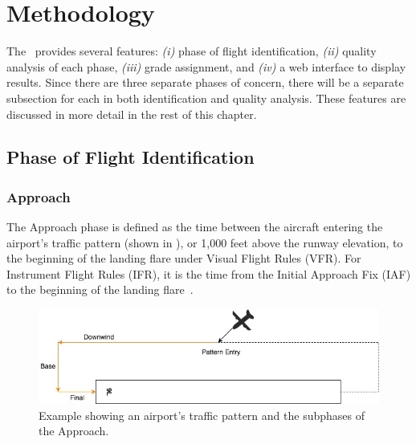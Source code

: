 \chapter{Methodology} \label{ch:methodology}

	The \toolname\ provides several features: \textit{(i)} phase of flight identification, \textit{(ii)} quality analysis of each phase, \textit{(iii)} grade assignment, and \textit{(iv)} a web interface to display results.  Since there are three separate phases of concern, there will be a separate subsection for each in both identification and quality analysis.  These features are discussed in more detail in the rest of this chapter.

\section{Phase of Flight Identification}


	\subsection{Approach}
    
    	The Approach phase is defined as the time between the aircraft entering the airport's traffic pattern (shown in ), or 1,000 feet above the runway elevation, to the beginning of the landing flare under Visual Flight Rules (VFR).  For Instrument Flight Rules (IFR), it is the time from the Initial Approach Fix (IAF) to the beginning of the landing flare~\cite{cictt2013phase}.
        
        \begin{figure}
        	\centering
            \includegraphics[width=\linewidth]{img/airport_traffic_pattern.jpg}
            \caption{Example showing an airport's traffic pattern and the subphases of the Approach.}
            \label{fig:traffic_pattern}
        \end{figure}
        
